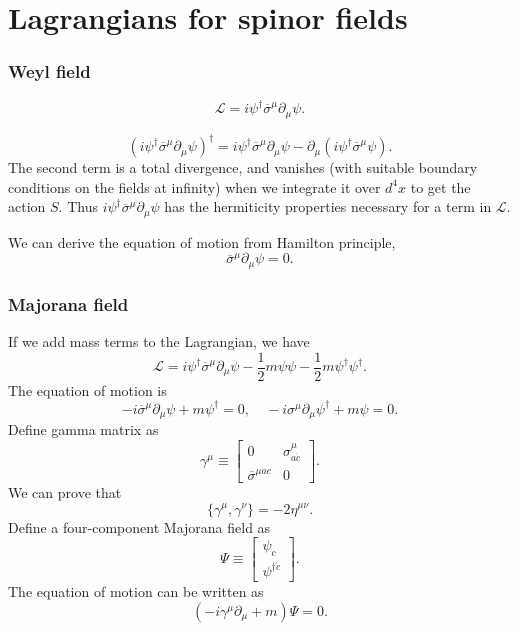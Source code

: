 \section{Lagrangians for spinor fields}
\subsubsection{Weyl field}
\[\mathcal{L} = i \psi^{\dagger} \overline{\sigma}^{\mu} \partial_{\mu} \psi .\]
\begin{note}
\[(i \psi^{\dagger} \overline{\sigma}^{\mu} \partial_{\mu} \psi)^{\dagger} = i \psi^{\dagger} \overline{\sigma}^{\mu} \partial_{\mu} \psi - \partial_{\mu}(i \psi^{\dagger} \overline{\sigma}^{\mu} \psi).\]
The second term is a total divergence, and vanishes (with suitable boundary conditions on the fields at infinity) when we integrate it over $d^4 x$ to get the action $S$. Thus $i \psi^{\dagger} \overline{\sigma}^{\mu} \partial_{\mu} \psi$  has the hermiticity properties necessary for a term in $\mathcal{L}$.
\end{note}
\noindent
We can derive the equation of motion from Hamilton principle,
\[\overline{\sigma}^{\mu} \partial_{\mu} \psi = 0.\]

\subsubsection{Majorana field}
If we add mass terms to the Lagrangian, we have
\[\mathcal{L} = i \psi^{\dagger} \overline{\sigma}^{\mu} \partial_{\mu} \psi - \frac{1}{2}m \psi \psi - \frac{1}{2}m \psi^{\dagger} \psi^{\dagger}.\]
The equation of motion is
\[-i\overline{\sigma}^{\mu} \partial_{\mu} \psi + m \psi^{\dagger} = 0 , \quad -i\sigma^{\mu} \partial_{\mu} \psi^{\dagger} + m \psi = 0 .\]
Define gamma matrix as
\[\gamma^{\mu} \equiv \left[ \begin{matrix} 0& \sigma^{\mu}_{a\dot{c}}\\ \overline{\sigma}^{\mu\dot{a}c}& 0\end{matrix} \right] .\]
We can prove that
\[\{\gamma^{\mu},\gamma^{\nu}\} = -2\eta^{\mu\nu}.\]
Define a four-component Majorana field as
\[\Psi \equiv \left[ \begin{matrix} \psi_c \\ \psi^{\dagger \dot{c}}\end{matrix} \right] .\]
The equation of motion can be written as
\[(-i\gamma^{\mu}\partial_{\mu}+m)\Psi=0.\]

